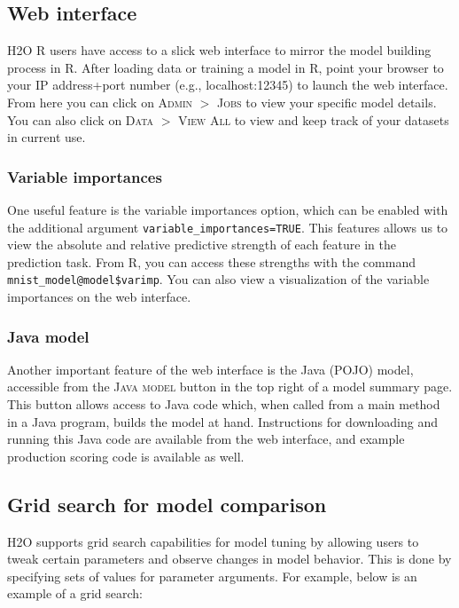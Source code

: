 \documentclass[11pt]{article}
\begin{document}
\subsection{Web interface} \label{3.3}

H2O R users have access to a slick web interface to mirror the model building process in R. After loading data or training a model in R, point your browser to your IP address+port number (e.g., localhost:12345) to launch the web interface. From here you can click on \textsc{Admin} $>$ \textsc{Jobs} to view your specific model details. You can also click on \textsc{Data} $>$ \textsc{View All} to view and keep track of your datasets in current use. 

\subsubsection{Variable importances} \label{3.3.1}

One useful feature is the variable importances option, which can be enabled with the additional argument \texttt{variable\_importances=TRUE}. This features allows us to view the absolute and relative predictive strength of each feature in the prediction task. From R, you can access these strengths with the command \texttt{mnist\_model@model\$varimp}. You can also view a visualization of the variable
importances on the web interface.

\subsubsection{Java model} \label{3.3.2}

Another important feature of the web interface is the Java (POJO) model, accessible from the \textsc{Java model} button in the top right of a model summary page. This button allows access to Java code which, when called from a main method in a Java program, builds the model at hand. Instructions for downloading and running this Java code are available from the web interface, and example production scoring  code is available as well.

\subsection{Grid search for model comparison} \label{3.4}

H2O supports grid search capabilities for model tuning by allowing users to tweak certain parameters and observe changes in model behavior. This is done by specifying sets of values for parameter arguments. For example, below is an example of a grid search:
\end{document}
